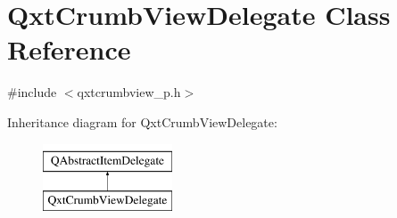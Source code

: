 \hypertarget{class_qxt_crumb_view_delegate}{\section{Qxt\-Crumb\-View\-Delegate Class Reference}
\label{class_qxt_crumb_view_delegate}
}


{\ttfamily \#include $<$qxtcrumbview\-\_\-p.\-h$>$}

Inheritance diagram for Qxt\-Crumb\-View\-Delegate\-:\begin{figure}[H]
\begin{center}
\leavevmode
\includegraphics[height=2.000000cm]{class_qxt_crumb_view_delegate}
\end{center}
\end{figure}
